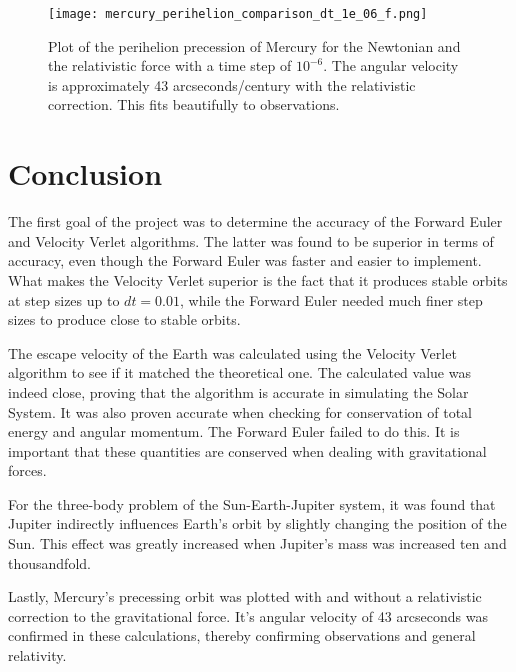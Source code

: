 \documentclass[10pt,a4paper,titlepage]{article}
\begin{document}
\begin{figure}[]
\centering
\centering\texttt{[image: mercury\_perihelion\_comparison\_dt\_1e\_06\_f.png]}
\caption{Plot of the perihelion precession of Mercury for the Newtonian and the relativistic force with a time step of $10^{-6}$. The angular velocity is approximately 43 arcseconds/century with the relativistic correction. This fits beautifully to observations.  \label{fig:mercury}}
\end{figure}

\section{Conclusion}
The first goal of the project was to determine the accuracy of the Forward Euler and Velocity Verlet algorithms. The latter was found to be superior in terms of accuracy, even though the Forward Euler was faster and easier to implement. What makes the Velocity Verlet superior is the fact that it produces stable orbits at step sizes up to $dt = \mathrm{0.01}$, while the Forward Euler needed much finer step sizes to produce close to stable orbits. 

The escape velocity of the Earth was calculated using the Velocity Verlet algorithm to see if it matched the theoretical one. The calculated value was indeed close, proving that the algorithm is accurate in simulating the Solar System. It was also proven accurate when checking for conservation of total energy and angular momentum. The Forward Euler failed to do this. It is important that these quantities are conserved when dealing with gravitational forces. 

For the three-body problem of the Sun-Earth-Jupiter system, it was found that Jupiter indirectly influences Earth's orbit by slightly changing the position of the Sun. This effect was greatly increased when Jupiter's mass was increased ten and thousandfold. 

Lastly, Mercury's precessing orbit was plotted with and without a relativistic correction to the gravitational force. It's angular velocity of 43 arcseconds was confirmed in these calculations, thereby confirming observations and general relativity. 




\end{document}
